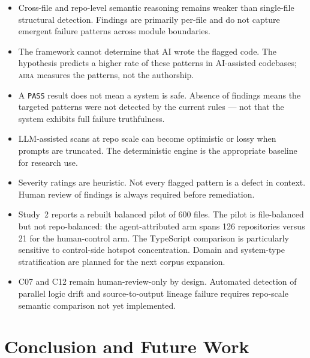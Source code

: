 \documentclass[11pt]{article}
\newcommand{\aira}{\textsc{aira}}
\begin{document}
\begin{itemize}
  \item Cross-file and repo-level semantic reasoning remains weaker than single-file
        structural detection. Findings are primarily per-file and do not capture emergent
        failure patterns across module boundaries.

  \item The framework cannot determine that AI wrote the flagged code. The hypothesis
        predicts a higher rate of these patterns in AI-assisted codebases; \aira{} measures
        the patterns, not the authorship.

  \item A \texttt{PASS} result does not mean a system is safe. Absence of findings means
        the targeted patterns were not detected by the current rules --- not that the system
        exhibits full failure truthfulness.

  \item LLM-assisted scans at repo scale can become optimistic or lossy when prompts are
        truncated. The deterministic engine is the appropriate baseline for research use.

  \item Severity ratings are heuristic. Not every flagged pattern is a defect in context.
        Human review of findings is always required before remediation.

  \item Study~2 reports a rebuilt balanced pilot of 600 files. The pilot is file-balanced
        but not repo-balanced: the agent-attributed arm spans 126 repositories versus 21
        for the human-control arm. The TypeScript comparison is particularly sensitive to
        control-side hotspot concentration. Domain and system-type stratification are planned
        for the next corpus expansion.

  \item C07 and C12 remain human-review-only by design. Automated detection of parallel
        logic drift and source-to-output lineage failure requires repo-scale semantic
        comparison not yet implemented.
\end{itemize}

\section{Conclusion and Future Work}
\label{sec:conclusion}
\end{document}
